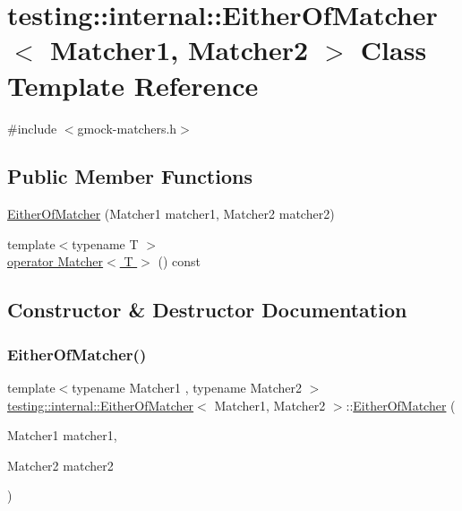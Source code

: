 \hypertarget{classtesting_1_1internal_1_1_either_of_matcher}{}\section{testing\+:\+:internal\+:\+:Either\+Of\+Matcher$<$ Matcher1, Matcher2 $>$ Class Template Reference}
\label{classtesting_1_1internal_1_1_either_of_matcher}


{\ttfamily \#include $<$gmock-\/matchers.\+h$>$}

\subsection*{Public Member Functions}
\begin{DoxyCompactItemize}
\item 
\hyperlink{classtesting_1_1internal_1_1_either_of_matcher_a5ae2361f20a0460870b72b83fcc0c643}{Either\+Of\+Matcher} (Matcher1 matcher1, Matcher2 matcher2)
\item 
{\footnotesize template$<$typename T $>$ }\\\hyperlink{classtesting_1_1internal_1_1_either_of_matcher_aef76a8b45451ec7abf845a2b9dd74bfb}{operator Matcher$<$ T $>$} () const
\end{DoxyCompactItemize}


\subsection{Constructor \& Destructor Documentation}
\mbox{\label{classtesting_1_1internal_1_1_either_of_matcher_a5ae2361f20a0460870b72b83fcc0c643}} 
\subsubsection{\texorpdfstring{Either\+Of\+Matcher()}{EitherOfMatcher()}}
{\footnotesize\ttfamily template$<$typename Matcher1 , typename Matcher2 $>$ \\
\hyperlink{classtesting_1_1internal_1_1_either_of_matcher}{testing\+::internal\+::\+Either\+Of\+Matcher}$<$ Matcher1, Matcher2 $>$\+::\hyperlink{classtesting_1_1internal_1_1_either_of_matcher}{Either\+Of\+Matcher} (\begin{DoxyParamCaption}\item[{Matcher1}]{matcher1,  }\item[{Matcher2}]{matcher2 }\end{DoxyParamCaption})\hspace{0.3cm}{\ttfamily [inline]}}



